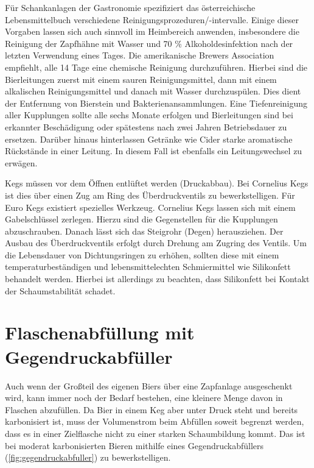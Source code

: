 \documentclass[a4paper,parskip=half]{scrartcl}
\begin{document}
Für Schankanlagen der Gastronomie spezifiziert das österreichische Lebensmittelbuch verschiedene Reinigungsprozeduren/-intervalle. Einige dieser Vorgaben lassen sich auch sinnvoll im Heimbereich anwenden, insbesondere die Reinigung der Zapfhähne mit Wasser und 70 \% Alkoholdesinfektion nach der letzten Verwendung eines Tages. \autocite{BMArbeit2016} Die amerikanische Brewers Association empfiehlt, alle 14 Tage eine chemische Reinigung durchzuführen. Hierbei sind die Bierleitungen zuerst mit einem sauren Reinigungsmittel, dann mit einem alkalischen Reinigungsmittel und danach mit Wasser durchzuspülen. Dies dient der Entfernung von Bierstein und Bakterienansammlungen. Eine Tiefenreinigung aller Kupplungen sollte alle sechs Monate erfolgen und Bierleitungen sind bei erkannter Beschädigung oder spätestens nach zwei Jahren Betriebsdauer zu ersetzen. Darüber hinaus hinterlassen Getränke wie Cider starke aromatische Rückstände in einer Leitung. In diesem Fall ist ebenfalls ein Leitungswechsel zu erwägen. \autocite{BrewersAssociation2019}

Kegs müssen vor dem Öffnen entlüftet werden (Druckabbau). Bei Cornelius Kegs ist dies über einen Zug am Ring des Überdruckventils zu bewerkstelligen. Für Euro Kegs existiert spezielles Werkzeug. Cornelius Kegs lassen sich mit einem Gabelschlüssel zerlegen. Hierzu sind die Gegenstellen für die Kupplungen abzuschrauben. Danach lässt sich das Steigrohr (Degen) herausziehen. Der Ausbau des Überdruckventils erfolgt durch Drehung am Zugring des Ventils. Um die Lebensdauer von Dichtungsringen zu erhöhen, sollten diese mit einem temperaturbeständigen und lebensmittelechten Schmiermittel wie Silikonfett behandelt werden. Hierbei ist allerdings zu beachten, dass Silikonfett bei Kontakt der Schaumstabilität schadet.

\section*{Flaschenabfüllung mit Gegendruckabfüller}

Auch wenn der Großteil des eigenen Biers über eine Zapfanlage ausgeschenkt wird, kann immer noch der Bedarf bestehen, eine kleinere Menge davon in Flaschen abzufüllen. Da Bier in einem Keg aber unter Druck steht und bereits karbonisiert ist, muss der Volumenstrom beim Abfüllen soweit begrenzt werden, dass es in einer Zielflasche nicht zu einer starken Schaumbildung kommt. Das ist bei moderat karbonisierten Bieren mithilfe eines Gegendruckabfüllers (\autoref{fig:gegendruckabfuller}) zu bewerkstelligen.
\end{document}
